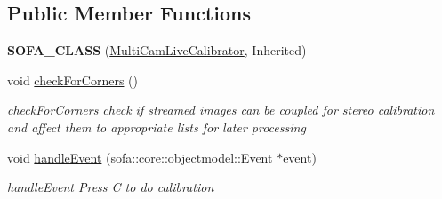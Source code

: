 \subsection*{Public Member Functions}
\begin{DoxyCompactItemize}
\item 
\mbox{\label{classsofa_1_1rgbdtracking_1_1_multi_cam_live_calibrator_a007f7836150579364a71841a4533c922}} 
{\bfseries S\+O\+F\+A\+\_\+\+C\+L\+A\+SS} (\hyperlink{classsofa_1_1rgbdtracking_1_1_multi_cam_live_calibrator}{Multi\+Cam\+Live\+Calibrator}, Inherited)
\item 
\mbox{\label{classsofa_1_1rgbdtracking_1_1_multi_cam_live_calibrator_a667b64f8e2f667838f9c27c35c0edd19}} 
void \hyperlink{classsofa_1_1rgbdtracking_1_1_multi_cam_live_calibrator_a667b64f8e2f667838f9c27c35c0edd19}{check\+For\+Corners} ()
\begin{DoxyCompactList}\small\item\em check\+For\+Corners check if streamed images can be coupled for stereo calibration and affect them to appropriate lists for later processing \end{DoxyCompactList}\item 
void \hyperlink{classsofa_1_1rgbdtracking_1_1_multi_cam_live_calibrator_a55eaadf487e62562e626cb15598f3f3b}{handle\+Event} (sofa\+::core\+::objectmodel\+::\+Event $\ast$event)
\begin{DoxyCompactList}\small\item\em handle\+Event Press C to do calibration \end{DoxyCompactList}\end{DoxyCompactItemize}
